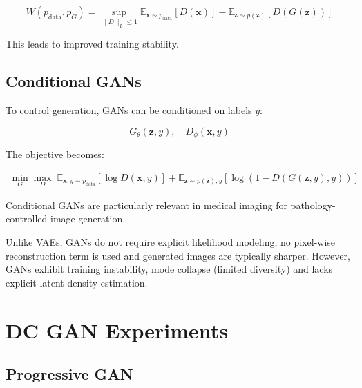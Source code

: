 \begin{equation}
W(p_{\text{data}}, p_G) =
\sup_{\|D\|_L \le 1}
\mathbb{E}_{\mathbf{x} \sim p_{\text{data}}}
[D(\mathbf{x})]
-
\mathbb{E}_{\mathbf{z} \sim p(\mathbf{z})}
[D(G(\mathbf{z}))]
\end{equation}

This leads to improved training stability.

\subsection{Conditional GANs}

To control generation, GANs can be conditioned on labels $y$:

\begin{equation}
G_\theta(\mathbf{z}, y), \quad
D_\phi(\mathbf{x}, y)
\end{equation}

The objective becomes:

\begin{align}
\min_G \max_D
\;
\mathbb{E}_{\mathbf{x},y \sim p_{\text{data}}}
[\log D(\mathbf{x}, y)]
+
\mathbb{E}_{\mathbf{z} \sim p(\mathbf{z}), y}
[\log(1 - D(G(\mathbf{z}, y), y))]
\end{align}

Conditional GANs are particularly relevant in medical imaging for pathology-controlled image generation.


Unlike VAEs, GANs do not require explicit likelihood modeling, no pixel-wise reconstruction term is used and generated images are typically sharper.
However, GANs exhibit  training instability, mode collapse (limited diversity) and lacks explicit latent density estimation.

\section{DC GAN Experiments}


\subsection{Progressive GAN}


